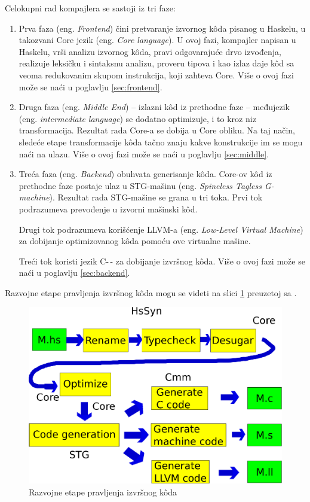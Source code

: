 Celokupni rad kompajlera se sastoji iz tri faze:
\begin{enumerate}
	\item Prva faza (eng. \emph{Frontend}) čini pretvaranje izvornog k\^{o}da pisanog u Haskelu, u takozvani Core jezik (eng. \emph {Core language}). U ovoj fazi, kompajler napisan u Haskelu, vrši analizu izvornog k\^{o}da, pravi odgovarajuće drvo izvođenja, realizuje leksičku i sintaksnu analizu, proveru tipova i kao izlaz daje k\^{o}d sa veoma redukovanim skupom instrukcija, koji zahteva Core. Više o ovoj fazi može se naći u poglavlju \ref{sec:frontend}.
	\item Druga faza (eng. \emph {Middle End}) – izlazni k\^{o}d iz prethodne faze – međujezik (eng. \emph {intermediate language}) se dodatno optimizuje, i to kroz niz transformacija. Rezultat rada Core-a se dobija u Core obliku. Na taj način, sledeće etape transformacije k\^{o}da tačno znaju kakve konstrukcije im se mogu naći na ulazu.  Više o ovoj fazi može se naći u poglavlju \ref{sec:middle}.
	\item Treća faza (eng. \emph {Backend}) obuhvata generisanje k\^{o}da. Core-ov k\^{o}d iz prethodne faze postaje ulaz u STG-mašinu (eng. \emph {Spineless Tagless G-machine}). Rezultat rada STG-mašine se grana u tri toka. Prvi tok podrazumeva prevođenje u izvorni mašinski k\^{o}d. 
	
	Drugi tok podrazumeva korišćenje LLVM-a (eng. \emph{Low-Level Virtual Machine}) za dobijanje optimizovanog k\^{o}da pomoću ove virtualne mašine.
	
	Treći tok koristi jezik C-\,- za dobijanje izvršnog k\^{o}da. Više o ovoj fazi može se naći u poglavlju \ref{sec:backend}.
\end{enumerate}

Razvojne etape pravljenja izvršnog k\^{o}da mogu se videti na slici \ref{fig:razvojneEtaple} preuzetoj sa \cite{StanfordGHC}.

\begin{figure}[h!]
	\begin{center}
		\includegraphics[scale=0.30]{resources/razvojneEtape.png}
	\end{center}
	\caption{Razvojne etape pravljenja izvršnog k\^{o}da}
	\label{fig:razvojneEtaple}
\end{figure}